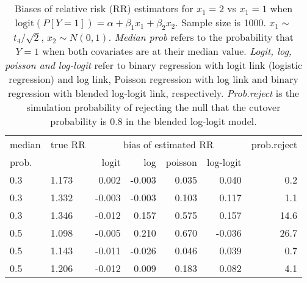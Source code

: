 \documentclass[12pt,a4paper]{article}
\begin{document}
\begin{table}[H] 
\small\sf\centering 
\caption{Biases of relative risk (RR) estimators for $x_1=2$ vs $x_1=1$ when $\mbox{logit}(P[Y=1])=\alpha+\beta_1 x_1 + \beta_2 x_2$. Sample size is 1000. $x_1 \sim $$t_4/\sqrt{2}$, $x_2 \sim N(0,1)$. {\it Median prob} refers to the probability that $Y=1$ when both covariates are at their median value. {\it Logit, log, poisson and log-logit} refer to binary regression with logit link (logistic regression) and log link, Poisson regression with log link and binary regression with blended log-logit link, respectively. {\it Prob.reject} is the simulation probability of rejecting the null that the cutover probability is $0.8$ in the blended log-logit model.} 
\begin{tabular}{llrrrrr} 
\toprule 
median & true RR & \multicolumn{4}{c}{bias of estimated RR} & prob.reject \\ 
prob. & & logit & log & poisson & log-logit  & \\ \midrule 
0.3 & 1.173 &  0.002 & -0.003 & 0.035 &  0.040 &  0.2 \\  
0.3 & 1.332 & -0.003 & -0.003 & 0.103 &  0.117 &  1.1 \\  
0.3 & 1.346 & -0.012 &  0.157 & 0.575 &  0.157 & 14.6 \\  
0.5 & 1.098 & -0.005 &  0.210 & 0.670 & -0.036 & 26.7 \\  
0.5 & 1.143 & -0.011 & -0.026 & 0.046 &  0.039 &  0.7 \\  
0.5 & 1.206 & -0.012 &  0.009 & 0.183 &  0.082 &  4.1 \\  
\bottomrule 
\end{tabular} 
\end{table} 
\end{document}
